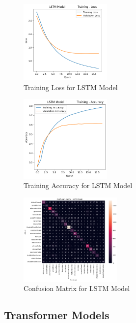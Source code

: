 \begin{figure}[H]
    \centering
    \includegraphics[width=0.4\textwidth]{dl_lstm_trainloss.png}
    \caption{Training Loss for LSTM Model}
    \label{fig:dl_lstm_trainloss}
\end{figure}

\begin{figure}[H]
    \centering
    \includegraphics[width=0.4\textwidth]{dl_lstm_trainaccuracy.png}
    \caption{Training Accuracy for LSTM Model}
    \label{fig:dl_lstm_trainaccuracy}
\end{figure}

\begin{figure}[H]
    \centering
    \includegraphics[width=0.45\textwidth]{dl_lstm_confmat.png}
    \caption{Confusion Matrix for LSTM Model}
    \label{fig:dl_lstm_confmat}
\end{figure}

\subsection{Transformer Models}

